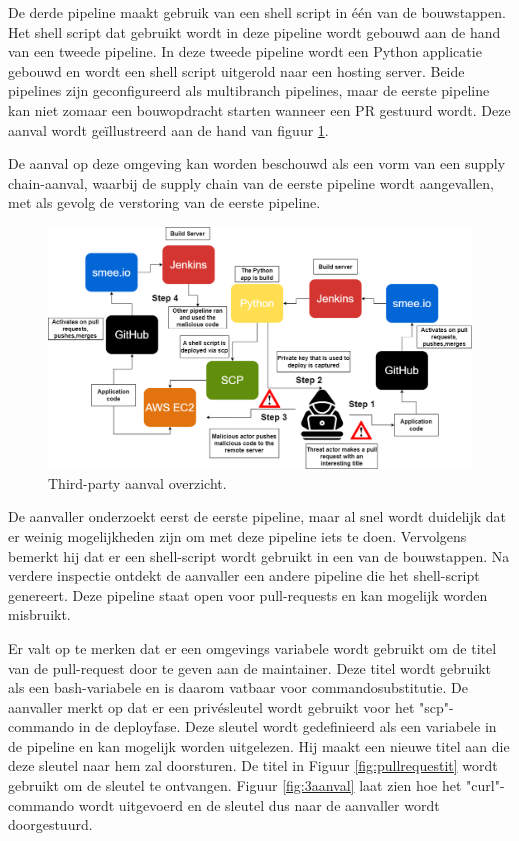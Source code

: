 De derde pipeline maakt gebruik van een shell script in één van de bouwstappen. Het shell script dat gebruikt wordt in deze pipeline wordt gebouwd aan de hand van een tweede pipeline. In deze tweede pipeline wordt een Python applicatie gebouwd en wordt een shell script uitgerold naar een hosting server. Beide pipelines zijn geconfigureerd als multibranch pipelines, maar de eerste pipeline kan niet zomaar een bouwopdracht starten wanneer een PR gestuurd wordt. Deze aanval wordt geïllustreerd aan de hand van figuur \ref{fig:thirdparty}.
\newline

De aanval op deze omgeving kan worden beschouwd als een vorm van een supply chain-aanval, waarbij de supply chain van de eerste pipeline wordt aangevallen, met als gevolg de verstoring van de eerste pipeline.
\newline

\begin{figure}[H]
  \includegraphics[scale=0.35]{graphics/attack3.png}
\caption{\label{fig:thirdparty} Third-party aanval overzicht.}
\end{figure}

De aanvaller onderzoekt eerst de eerste pipeline, maar al snel wordt duidelijk dat er weinig mogelijkheden zijn om met deze pipeline iets te doen. Vervolgens bemerkt hij dat er een shell-script wordt gebruikt in een van de bouwstappen. Na verdere inspectie ontdekt de aanvaller een andere pipeline die het shell-script genereert. Deze pipeline staat open voor pull-requests en kan mogelijk worden misbruikt.
\clearpage

Er valt op te merken dat er een omgevings variabele wordt gebruikt om de titel van de pull-request door te geven aan de maintainer. Deze titel wordt gebruikt als een bash-variabele en is daarom vatbaar voor commandosubstitutie. De aanvaller merkt op dat er een privésleutel wordt gebruikt voor het "scp"-commando in de deployfase. Deze sleutel wordt gedefinieerd als een variabele in de pipeline en kan mogelijk worden uitgelezen. Hij maakt een nieuwe titel aan die deze sleutel naar hem zal doorsturen. De titel in Figuur \ref{fig:pullrequestit} wordt gebruikt om de sleutel te ontvangen. Figuur \ref{fig:3aanval} laat zien hoe het "curl"-commando wordt uitgevoerd en de sleutel dus naar de aanvaller wordt doorgestuurd.
\newline

